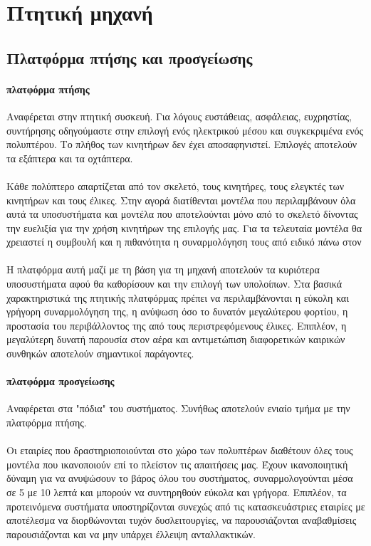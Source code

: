 \documentclass[a4paper, 12pt, twoside]{report}
\begin{document}
{{{{{{		
		\section{Πτητική μηχανή}
		\subsection{Πλατφόρμα πτήσης και προσγείωσης}
			\paragraph{πλατφόρμα πτήσης}{Αναφέρεται στην πτητική συσκευή. Για λόγους ευστάθειας, ασφάλειας, ευχρηστίας, συντήρησης οδηγούμαστε στην επιλογή ενός ηλεκτρικού μέσου και συγκεκριμένα ενός πολυπτέρου. Το πλήθος των κινητήρων δεν έχει αποσαφηνιστεί. Επιλογές αποτελούν τα εξάπτερα και τα οχτάπτερα.
			}
			\paragraph{}{Κάθε πολύπτερο απαρτίζεται από τον σκελετό, τους κινητήρες, τους ελεγκτές των κινητήρων και τους έλικες. Στην αγορά διατίθενται μοντέλα που περιλαμβάνουν όλα αυτά τα υποσυστήματα και μοντέλα που αποτελούνται μόνο από το σκελετό δίνοντας την ευελιξία για την χρήση κινητήρων της επιλογής μας. Για τα τελευταία μοντέλα θα χρειαστεί η συμβουλή και η πιθανότητα η συναρμολόγηση τους από ειδικό πάνω στον
			}
			\paragraph{}{Η πλατφόρμα αυτή μαζί με τη βάση για τη μηχανή αποτελούν τα κυριότερα υποσυστήματα αφού θα καθορίσουν και την επιλογή των υπολοίπων. Στα βασικά χαρακτηριστικά της πτητικής πλατφόρμας πρέπει να περιλαμβάνονται η εύκολη και γρήγορη συναρμολόγηση της, η ανύψωση όσο το δυνατόν μεγαλύτερου φορτίου, η προστασία του περιβάλλοντος της από τους περιστρεφόμενους έλικες. Επιπλέον, η μεγαλύτερη δυνατή παρουσία στον αέρα και αντιμετώπιση διαφορετικών καιρικών συνθηκών αποτελούν σημαντικοί παράγοντες.
			}			
			\paragraph{πλατφόρμα προσγείωσης}{Αναφέρεται στα "πόδια" του συστήματος. Συνήθως αποτελούν ενιαίο τμήμα με την πλατφόρμα πτήσης.
			}
			\paragraph{}{Οι εταιρίες που δραστηριοποιούνται στο χώρο των πολυπτέρων διαθέτουν όλες τους μοντέλα που ικανοποιούν επί το πλείστον τις απαιτήσεις μας. Έχουν ικανοποιητική δύναμη για να ανυψώσουν το βάρος όλου του συστήματος, συναρμολογούνται μέσα σε 5 με 10 λεπτά και μπορούν να συντηρηθούν εύκολα και γρήγορα. Επιπλέον, τα προτεινόμενα συστήματα υποστηρίζονται συνεχώς από τις κατασκευάστριες εταιρίες με αποτέλεσμα να διορθώνονται τυχόν δυσλειτουργίες, να παρουσιάζονται αναβαθμίσεις παρουσιάζονται και να μην υπάρχει έλλειψη ανταλλακτικών.
			}
}}}}}}
\end{document}
